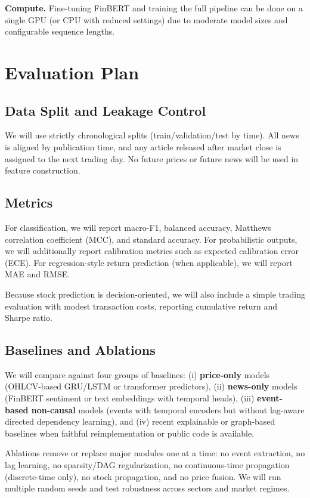 \documentclass[sigconf,review]{acmart}
\begin{document}
\textbf{Compute.} Fine-tuning FinBERT and training the full pipeline can be done on a single GPU (or CPU with reduced settings) due to moderate model sizes and configurable sequence lengths.

\section{Evaluation Plan}
\subsection{Data Split and Leakage Control}
We will use strictly chronological splits (train/validation/test by time). All news is aligned by publication time, and any article released after market close is assigned to the next trading day. No future prices or future news will be used in feature construction.

\subsection{Metrics}
For classification, we will report macro-F1, balanced accuracy, Matthews correlation coefficient (MCC), and standard accuracy. For probabilistic outputs, we will additionally report calibration metrics such as expected calibration error (ECE). For regression-style return prediction (when applicable), we will report MAE and RMSE.

Because stock prediction is decision-oriented, we will also include a simple trading evaluation with modest transaction costs, reporting cumulative return and Sharpe ratio.

\subsection{Baselines and Ablations}
We will compare against four groups of baselines: (i) \textbf{price-only} models (OHLCV-based GRU/LSTM or transformer predictors), (ii) \textbf{news-only} models (FinBERT sentiment or text embeddings with temporal heads), (iii) \textbf{event-based non-causal} models (events with temporal encoders but without lag-aware directed dependency learning), and (iv) recent explainable or graph-based baselines when faithful reimplementation or public code is available.

Ablations remove or replace major modules one at a time: no event extraction, no lag learning, no sparsity/DAG regularization, no continuous-time propagation (discrete-time only), no stock propagation, and no price fusion. We will run multiple random seeds and test robustness across sectors and market regimes.
\end{document}
